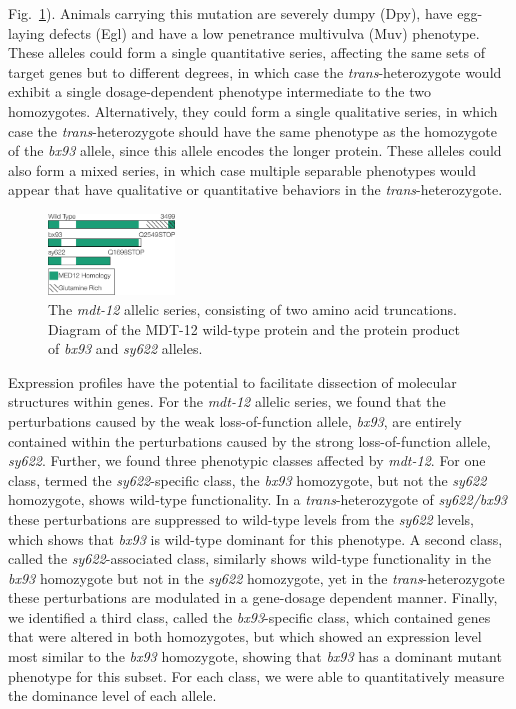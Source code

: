 \documentclass[10pt, twocolumn]{article}
\newcommand{\gene}[1]{\mbox{\emph{#1}}}
\newcommand{\protein}[1]{\mbox{\uppercase{#1}}}
\newcommand{\dpy}{\gene{mdt-12}}
\begin{document}
Fig.~\ref{fig:dpy22}). Animals carrying this mutation are severely dumpy (Dpy),
have egg-laying defects (Egl) and have a low penetrance multivulva (Muv)
phenotype. These alleles could form a single quantitative series, affecting the
same sets of target genes but to different degrees, in which case the
\emph{trans}-heterozygote would exhibit a single dosage-dependent phenotype
intermediate to the two homozygotes. Alternatively, they could form a single
qualitative series, in which case the \emph{trans}-heterozygote should have the
same phenotype as the homozygote of the \emph{bx93} allele, since this allele
encodes the longer protein. These alleles could also form a mixed series, in
which case multiple separable phenotypes would appear that have qualitative or
quantitative behaviors in the \emph{trans}-heterozygote.

\begin{figure}
  \centering{}
  \includegraphics[width=0.3\textwidth]{../figs/gene_model_dpy22.pdf}
  \caption{
    The \dpy{} allelic series, consisting of two amino acid truncations. Diagram
    of the \protein{mdt-12} wild-type protein and the protein product of
    \emph{bx93} and \emph{sy622} alleles.
    }
\label{fig:dpy22}
\end{figure}

Expression profiles have the potential to facilitate dissection of molecular
structures within genes. For the \dpy{} allelic series, we found that the
perturbations caused by the weak loss-of-function allele, \emph{bx93}, are
entirely contained within the perturbations caused by the strong
loss-of-function allele, \emph{sy622}. Further, we found three phenotypic
classes affected by \dpy{}. For one class, termed the \emph{sy622}-specific
class, the \emph{bx93} homozygote, but not the \emph{sy622} homozygote, shows
wild-type functionality. In a \emph{trans}-heterozygote of \emph{sy622/bx93}
these perturbations are suppressed to wild-type levels from the \emph{sy622}
levels, which shows that \emph{bx93} is wild-type dominant for this phenotype. A
second class, called the \emph{sy622}-associated class, similarly shows
wild-type functionality in the \emph{bx93} homozygote but not in the
\emph{sy622} homozygote, yet in the \emph{trans}-heterozygote these
perturbations are modulated in a gene-dosage dependent manner. Finally, we
identified a third class, called the \emph{bx93}-specific class, which contained
genes that were altered in both homozygotes, but which showed an expression
level most similar to the \emph{bx93} homozygote, showing that \emph{bx93} has a
dominant mutant phenotype for this subset. For each class, we were able to
quantitatively measure the dominance level of each allele.
\end{document}
